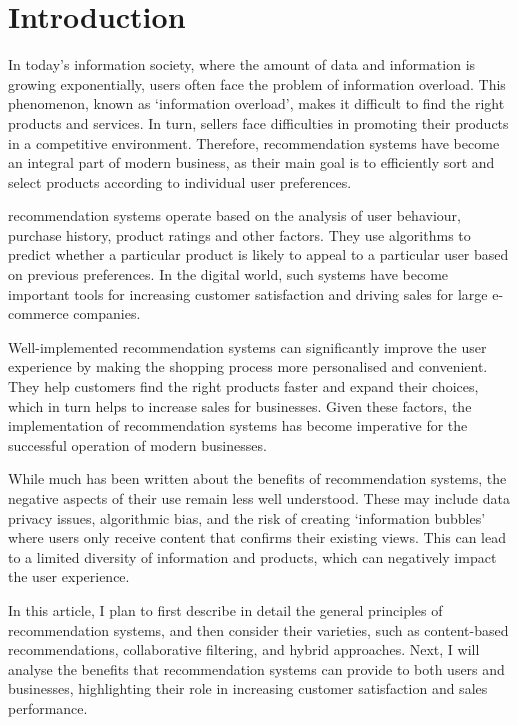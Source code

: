 \documentclass[10pt,twoside,slovak,a4paper]{article}
\begin{document}



\section{Introduction}
In today's information society, where the amount of data and information is growing exponentially, users often face the problem of information overload. This phenomenon, known as ‘information overload’, makes it difficult to find the right products and services. In turn, sellers face difficulties in promoting their products in a competitive environment. Therefore, recommendation systems have become an integral part of modern business, as their main goal is to efficiently sort and select products according to individual user preferences.

recommendation systems operate based on the analysis of user behaviour, purchase history, product ratings and other factors. They use algorithms to predict whether a particular product is likely to appeal to a particular user based on previous preferences. In the digital world, such systems have become important tools for increasing customer satisfaction and driving sales for large e-commerce companies.

Well-implemented recommendation systems can significantly improve the user experience by making the shopping process more personalised and convenient. They help customers find the right products faster and expand their choices, which in turn helps to increase sales for businesses. Given these factors, the implementation of recommendation systems has become imperative for the successful operation of modern businesses.


While much has been written about the benefits of recommendation systems, the negative aspects of their use remain less well understood. These may include data privacy issues, algorithmic bias, and the risk of creating ‘information bubbles’ where users only receive content that confirms their existing views. This can lead to a limited diversity of information and products, which can negatively impact the user experience.

In this article, I plan to first describe in detail the general principles of recommendation systems, and then consider their varieties, such as content-based recommendations, collaborative filtering, and hybrid approaches. Next, I will analyse the benefits that recommendation systems can provide to both users and businesses, highlighting their role in increasing customer satisfaction and sales performance.
\end{document}
